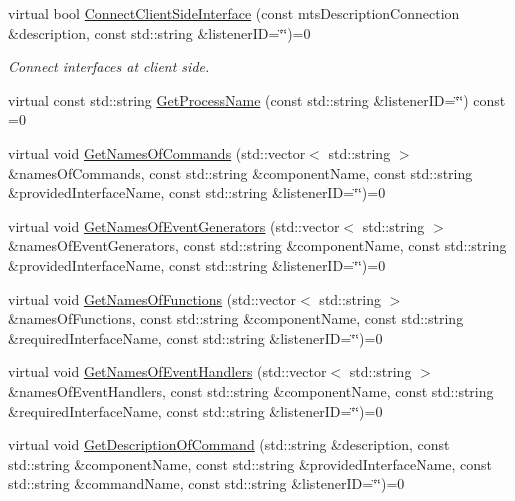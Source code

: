 \begin{DoxyCompactItemize}
virtual bool \hyperlink{classmts_manager_local_interface_ac89f1ce8ca7e003b085b56aa25a72117}{Connect\+Client\+Side\+Interface} (const mts\+Description\+Connection \&description, const std\+::string \&listener\+I\+D=\char`\"{}\char`\"{})=0
\begin{DoxyCompactList}\small\item\em Connect interfaces at client side. \end{DoxyCompactList}\item 
virtual const std\+::string \hyperlink{classmts_manager_local_interface_af0a457e2895c8e4fc74aebdfce72d7c8}{Get\+Process\+Name} (const std\+::string \&listener\+I\+D=\char`\"{}\char`\"{}) const =0
\item 
virtual void \hyperlink{classmts_manager_local_interface_aab7e0d3a40ec1648db29ac89c4637e8c}{Get\+Names\+Of\+Commands} (std\+::vector$<$ std\+::string $>$ \&names\+Of\+Commands, const std\+::string \&component\+Name, const std\+::string \&provided\+Interface\+Name, const std\+::string \&listener\+I\+D=\char`\"{}\char`\"{})=0
\item 
virtual void \hyperlink{classmts_manager_local_interface_ad38b0648dfc2b65a8e52329c177d60c5}{Get\+Names\+Of\+Event\+Generators} (std\+::vector$<$ std\+::string $>$ \&names\+Of\+Event\+Generators, const std\+::string \&component\+Name, const std\+::string \&provided\+Interface\+Name, const std\+::string \&listener\+I\+D=\char`\"{}\char`\"{})=0
\item 
virtual void \hyperlink{classmts_manager_local_interface_a3173ffcf8034e0349e09a11704a5e488}{Get\+Names\+Of\+Functions} (std\+::vector$<$ std\+::string $>$ \&names\+Of\+Functions, const std\+::string \&component\+Name, const std\+::string \&required\+Interface\+Name, const std\+::string \&listener\+I\+D=\char`\"{}\char`\"{})=0
\item 
virtual void \hyperlink{classmts_manager_local_interface_a6039080ae305d1088608aa8ab3268d3e}{Get\+Names\+Of\+Event\+Handlers} (std\+::vector$<$ std\+::string $>$ \&names\+Of\+Event\+Handlers, const std\+::string \&component\+Name, const std\+::string \&required\+Interface\+Name, const std\+::string \&listener\+I\+D=\char`\"{}\char`\"{})=0
\item 
virtual void \hyperlink{classmts_manager_local_interface_a2d8b5e7595a9e33111ed927b363f22fd}{Get\+Description\+Of\+Command} (std\+::string \&description, const std\+::string \&component\+Name, const std\+::string \&provided\+Interface\+Name, const std\+::string \&command\+Name, const std\+::string \&listener\+I\+D=\char`\"{}\char`\"{})=0

\end{DoxyCompactItemize}
